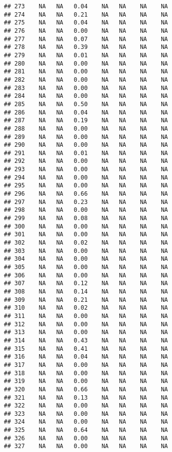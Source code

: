 \documentclass{article}\usepackage{graphicx, color}
\makeatletter
\newenvironment{kframe}{%
 \def\at@end@of@kframe{}%
 \ifinner\ifhmode%
  \def\at@end@of@kframe{\end{minipage}}%
  \begin{minipage}{\columnwidth}%
 \fi\fi%
 \def\FrameCommand##1{\hskip\@totalleftmargin \hskip-\fboxsep
 \colorbox{shadecolor}{##1}\hskip-\fboxsep
     \hskip-\linewidth \hskip-\@totalleftmargin \hskip\columnwidth}%
 \MakeFramed {\advance\hsize-\width
   \@totalleftmargin\z@ \linewidth\hsize
   \@setminipage}}%
 {\par\unskip\endMakeFramed%
 \at@end@of@kframe}
\newenvironment{knitrout}{}{} %
\makeatother
\begin{document}
\begin{knitrout}
\begin{kframe}
\begin{verbatim}
## 273    NA   NA   0.04    NA   NA    NA    NA
## 274    NA   NA   0.21    NA   NA    NA    NA
## 275    NA   NA   0.04    NA   NA    NA    NA
## 276    NA   NA   0.00    NA   NA    NA    NA
## 277    NA   NA   0.07    NA   NA    NA    NA
## 278    NA   NA   0.39    NA   NA    NA    NA
## 279    NA   NA   0.01    NA   NA    NA    NA
## 280    NA   NA   0.00    NA   NA    NA    NA
## 281    NA   NA   0.00    NA   NA    NA    NA
## 282    NA   NA   0.00    NA   NA    NA    NA
## 283    NA   NA   0.00    NA   NA    NA    NA
## 284    NA   NA   0.00    NA   NA    NA    NA
## 285    NA   NA   0.50    NA   NA    NA    NA
## 286    NA   NA   0.04    NA   NA    NA    NA
## 287    NA   NA   0.19    NA   NA    NA    NA
## 288    NA   NA   0.00    NA   NA    NA    NA
## 289    NA   NA   0.00    NA   NA    NA    NA
## 290    NA   NA   0.00    NA   NA    NA    NA
## 291    NA   NA   0.01    NA   NA    NA    NA
## 292    NA   NA   0.00    NA   NA    NA    NA
## 293    NA   NA   0.00    NA   NA    NA    NA
## 294    NA   NA   0.00    NA   NA    NA    NA
## 295    NA   NA   0.00    NA   NA    NA    NA
## 296    NA   NA   0.66    NA   NA    NA    NA
## 297    NA   NA   0.23    NA   NA    NA    NA
## 298    NA   NA   0.00    NA   NA    NA    NA
## 299    NA   NA   0.08    NA   NA    NA    NA
## 300    NA   NA   0.00    NA   NA    NA    NA
## 301    NA   NA   0.00    NA   NA    NA    NA
## 302    NA   NA   0.02    NA   NA    NA    NA
## 303    NA   NA   0.00    NA   NA    NA    NA
## 304    NA   NA   0.00    NA   NA    NA    NA
## 305    NA   NA   0.00    NA   NA    NA    NA
## 306    NA   NA   0.00    NA   NA    NA    NA
## 307    NA   NA   0.12    NA   NA    NA    NA
## 308    NA   NA   0.14    NA   NA    NA    NA
## 309    NA   NA   0.21    NA   NA    NA    NA
## 310    NA   NA   0.02    NA   NA    NA    NA
## 311    NA   NA   0.00    NA   NA    NA    NA
## 312    NA   NA   0.00    NA   NA    NA    NA
## 313    NA   NA   0.00    NA   NA    NA    NA
## 314    NA   NA   0.43    NA   NA    NA    NA
## 315    NA   NA   0.41    NA   NA    NA    NA
## 316    NA   NA   0.04    NA   NA    NA    NA
## 317    NA   NA   0.00    NA   NA    NA    NA
## 318    NA   NA   0.00    NA   NA    NA    NA
## 319    NA   NA   0.00    NA   NA    NA    NA
## 320    NA   NA   0.66    NA   NA    NA    NA
## 321    NA   NA   0.13    NA   NA    NA    NA
## 322    NA   NA   0.00    NA   NA    NA    NA
## 323    NA   NA   0.00    NA   NA    NA    NA
## 324    NA   NA   0.00    NA   NA    NA    NA
## 325    NA   NA   0.64    NA   NA    NA    NA
## 326    NA   NA   0.00    NA   NA    NA    NA
## 327    NA   NA   0.00    NA   NA    NA    NA

\end{verbatim}
\end{kframe}
\end{knitrout}
\end{document}
